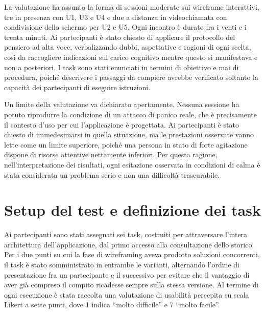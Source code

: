La valutazione ha assunto la forma di sessioni moderate sui wireframe interattivi, tre in presenza con U1, U3 e U4 e due a distanza in videochiamata con condivisione dello schermo per U2 e U5.
Ogni incontro è durato fra i venti e i trenta minuti.
Ai partecipanti è stato chiesto di applicare il protocollo del pensiero ad alta voce, verbalizzando dubbi, aspettative e ragioni di ogni scelta, così da raccogliere indicazioni sul carico cognitivo mentre questo si manifestava e non a posteriori.
I task sono stati enunciati in termini di obiettivo e mai di procedura, poiché descrivere i passaggi da compiere avrebbe verificato soltanto la capacità dei partecipanti di eseguire istruzioni.

Un limite della valutazione va dichiarato apertamente.
Nessuna sessione ha potuto riprodurre la condizione di un attacco di panico reale, che è precisamente il contesto d'uso per cui l'applicazione è progettata.
Ai partecipanti è stato chiesto di immedesimarsi in quella situazione, ma le prestazioni osservate vanno lette come un limite superiore, poiché una persona in stato di forte agitazione dispone di risorse attentive nettamente inferiori.
Per questa ragione, nell'interpretazione dei risultati, ogni esitazione osservata in condizioni di calma è stata considerata un problema serio e non una difficoltà trascurabile.

\section{Setup del test e definizione dei task}
\label{sec:setup-task}

Ai partecipanti sono stati assegnati sei task, costruiti per attraversare l'intera architettura dell'applicazione, dal primo accesso alla consultazione dello storico.
Per i due punti su cui la fase di wireframing aveva prodotto soluzioni concorrenti, il task è stato somministrato in entrambe le varianti, alternando l'ordine di presentazione fra un partecipante e il successivo per evitare che il vantaggio di aver già compreso il compito ricadesse sempre sulla stessa versione.
Al termine di ogni esecuzione è stata raccolta una valutazione di usabilità percepita su scala Likert a sette punti, dove 1 indica \enquote{molto difficile} e 7 \enquote{molto facile}.


